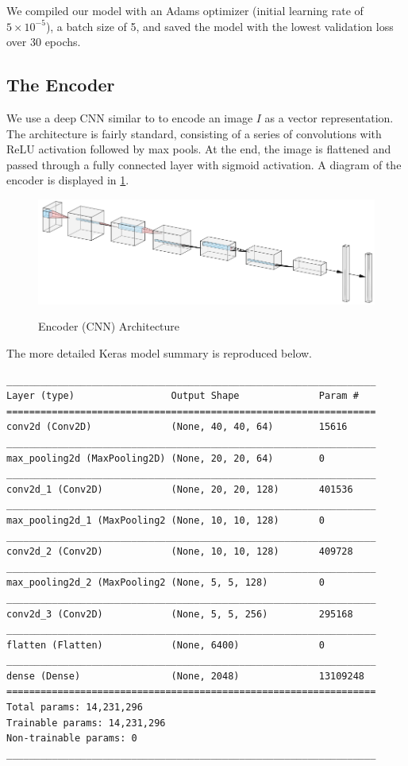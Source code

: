 \documentclass[12pt]{article}
\begin{document}
We compiled our model with an Adams optimizer (initial learning rate of \(5 \times 10^{-5}\)), a batch size of 5, and saved the model with the lowest validation loss over 30 epochs.

\subsection{The Encoder} \label{subsec:the_encoder}

We use a deep CNN similar to \citet{tds} to encode an image \(I\) as a vector representation. The architecture is fairly standard, consisting of a series of convolutions with ReLU activation followed by max pools. At the end, the image is flattened and passed through a fully connected layer with sigmoid activation. A diagram of the encoder is displayed in \cref{fig:encoder}.

\begin{figure}[H]
    \centering
    \caption{Encoder (CNN) Architecture}
    \includegraphics[width=.9\textwidth]{encoder.png}
    \label{fig:encoder}
\end{figure}

The more detailed Keras model summary is reproduced below.
\begin{lstlisting}
_________________________________________________________________
Layer (type)                 Output Shape              Param #
=================================================================
conv2d (Conv2D)              (None, 40, 40, 64)        15616
_________________________________________________________________
max_pooling2d (MaxPooling2D) (None, 20, 20, 64)        0
_________________________________________________________________
conv2d_1 (Conv2D)            (None, 20, 20, 128)       401536
_________________________________________________________________
max_pooling2d_1 (MaxPooling2 (None, 10, 10, 128)       0
_________________________________________________________________
conv2d_2 (Conv2D)            (None, 10, 10, 128)       409728
_________________________________________________________________
max_pooling2d_2 (MaxPooling2 (None, 5, 5, 128)         0
_________________________________________________________________
conv2d_3 (Conv2D)            (None, 5, 5, 256)         295168
_________________________________________________________________
flatten (Flatten)            (None, 6400)              0
_________________________________________________________________
dense (Dense)                (None, 2048)              13109248
=================================================================
Total params: 14,231,296
Trainable params: 14,231,296
Non-trainable params: 0
_________________________________________________________________
\end{lstlisting}
\end{document}
